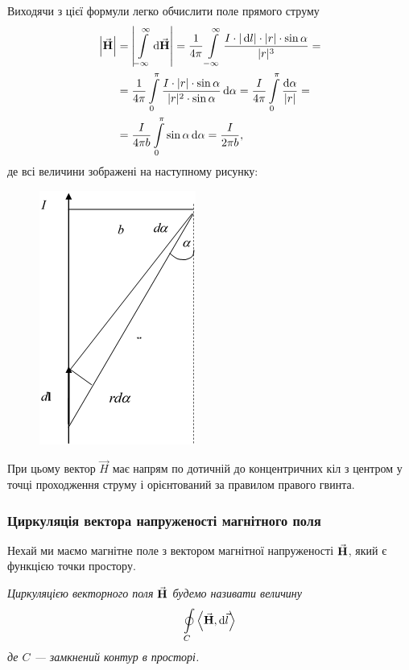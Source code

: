 Виходячи з цієї формули легко обчислити поле прямого струму
\begin{equation}
	\begin{aligned}
		\left| {\vec{\mathbf{H}}} \right| &= \left| \displaystyle\int\limits_{-\infty}^\infty \mathop{}\!\mathrm{d} {\vec{\mathbf{H}}} \right| = \frac{1}{4\pi} \displaystyle\int\limits_{-\infty}^\infty \frac{I \cdot |\mathop{}\!\mathrm{d} l| \cdot |r| \cdot \sin \alpha}{|r|^3} = \\
		&= \frac{1}{4\pi} \displaystyle\int\limits_0^\pi \frac{I \cdot |r| \cdot \sin \alpha}{|r|^2 \cdot \sin \alpha} \mathop{}\!\mathrm{d} \alpha = \frac{I}{4\pi} \displaystyle\int\limits_0^\pi \frac{\mathop{}\!\mathrm{d} \alpha}{|r|} = \\
		&= \frac{I}{4\pi b} \displaystyle\int\limits_0^\pi \sin \alpha \mathop{}\!\mathrm{d} \alpha = \frac{I}{2\pi b},
	\end{aligned}
\end{equation}
де всі величини зображені на наступному рисунку:
\begin{figure}[H]
	\centering
	\includegraphics[]{img/13-2.png}
\end{figure}

При цьому вектор $\vec H$ має напрям по дотичній до концентричних кіл з центром у точці проходження струму і орієнтований за правилом правого гвинта.

\subsubsection{Циркуляція вектора напруженості магнітного поля}

Нехай ми маємо магнітне поле з вектором магнітної напруженості ${\vec{\mathbf{H}}}$, який є функцією точки простору. 

\begin{definition}
	\it{Циркуляцією} векторного поля ${\vec{\mathbf{H}}}$ будемо називати величину
	\begin{equation}
		\Oint_C \langle \vecf H, \diff \vec l \rangle
	\end{equation}
	де $C$ --- замкнений контур в просторі. 
\end{definition}

